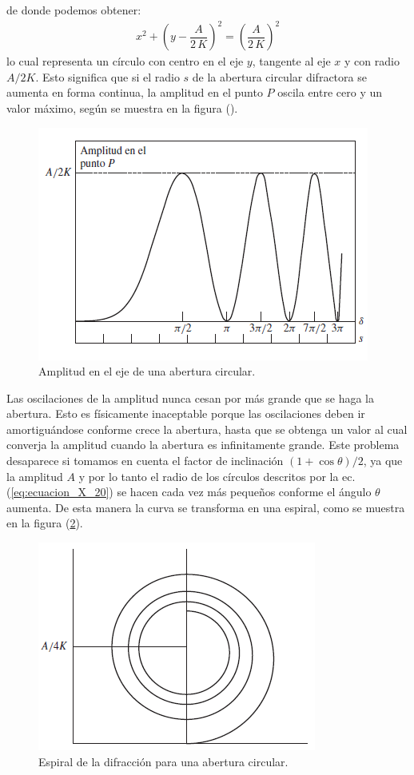 \documentclass[14pt]{extarticle}
\begin{document}
de donde podemos obtener:
\begin{align}
x^{2} + \left( y - \dfrac{A}{2 \, K} \right)^{2} = \left( \dfrac{A}{2 \, K} \right)^{2}
\label{eq:ecuacion_X_29} 
\end{align}
lo cual representa un círculo con centro en el eje $y$, tangente al eje $x$ y con radio $A/2K$. Esto significa que si el radio $s$ de la abertura circular difractora se aumenta en forma continua, la amplitud en el punto $P$ oscila entre cero y un valor máximo, según se muestra en la figura ().
\begin{figure}[H]
    \centering
    \includegraphics[scale=1]{Imagenes/Difraccion_11.png}
    \caption{Amplitud en el eje de una abertura circular.}
    \label{fig:figura_X_11}
\end{figure}
Las oscilaciones de la amplitud nunca cesan por más grande que se haga la abertura. Esto es físicamente inaceptable porque las oscilaciones deben ir amortiguándose conforme crece la abertura, hasta que se obtenga un valor al cual converja la amplitud cuando la abertura es infinitamente grande. Este problema desaparece si tomamos en cuenta el factor de inclinación $(1 + \cos \theta)/2$, ya que la amplitud $A$ y por lo tanto el radio de los círculos descritos por la ec. (\ref{eq:ecuacion_X_20}) se hacen cada vez más pequeños conforme el ángulo $\theta$ aumenta. De esta manera la curva se transforma en una espiral, como se muestra en la figura (\ref{fig:figura_X_12}).
\begin{figure}[H]
    \centering
    \includegraphics[scale=1]{Imagenes/Difraccion_12.png}
    \caption{Espiral de la difracción para una abertura circular.}
    \label{fig:figura_X_12}
\end{figure}
\end{document}
